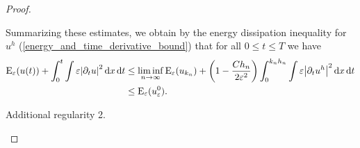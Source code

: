 \begin{proof}
\begin{description}[wide=0pt]
		Summarizing these estimates, we obtain by the energy dissipation inequality for $ u^{ h } $ (\ref{energy_and_time_derivative_bound}) that for all $ 0 \leq t \leq T $ we have
		\begin{align*}
			\operatorname{E}_{ \varepsilon } ( u ( t ) )
			+
			\int_{ 0 }^{ t }
			\int
			\varepsilon
			\abs{ \partial_{ t } u }^{ 2 }
			\dd{ x }
			\dd{ t }
			& \leq
			\liminf_{ n \to \infty }
			\operatorname{E}_{ \varepsilon } ( u_{ k_{ n } } )
			+
			\left( 1 - \frac{ C h_{ n } }{ 2 \varepsilon^{ 2 } } \right)
			\int_{ 0 }^{ k_{ n } h_{ n } }
			\int
			\varepsilon
			\abs{ \partial_{ t } u^{ h } }^{ 2 }
			\dd{ x }
			\dd{ t }
			\\
			& \leq
			\operatorname{E}_{ \varepsilon } ( u_{ \varepsilon }^{ 0 } ).
		\end{align*}
		
		\item[Step 8:] Additional regularity 2.
		

\end{description}
\end{proof}
